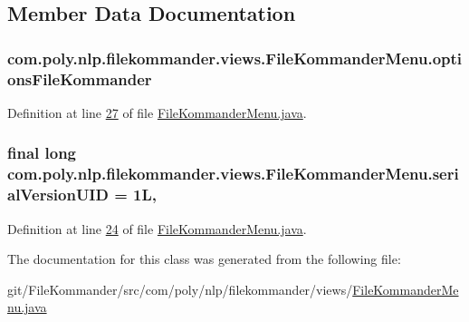 \subsection{Member Data Documentation}
\hypertarget{classcom_1_1poly_1_1nlp_1_1filekommander_1_1views_1_1_file_kommander_menu_a003b2d89fc465db1befab3410121166d}{
\subsubsection[{options\-File\-Kommander}]{ com.\-poly.\-nlp.\-filekommander.\-views.\-File\-Kommander\-Menu.\-options\-File\-Kommander\hspace{0.3cm}{\ttfamily [package]}}}\label{classcom_1_1poly_1_1nlp_1_1filekommander_1_1views_1_1_file_kommander_menu_a003b2d89fc465db1befab3410121166d}


Definition at line \hyperlink{L27}{27} of file \hyperlink{}{File\-Kommander\-Menu.\-java}.

\hypertarget{classcom_1_1poly_1_1nlp_1_1filekommander_1_1views_1_1_file_kommander_menu_ae9f2507a684bcf4de4a7196385e179c7}{
\subsubsection[{serial\-Version\-U\-I\-D}]{\setlength{\rightskip}{0pt plus 5cm}final long com.\-poly.\-nlp.\-filekommander.\-views.\-File\-Kommander\-Menu.\-serial\-Version\-U\-I\-D = 1\-L\hspace{0.3cm}{\ttfamily [static]}, {\ttfamily [private]}}}\label{classcom_1_1poly_1_1nlp_1_1filekommander_1_1views_1_1_file_kommander_menu_ae9f2507a684bcf4de4a7196385e179c7}


Definition at line \hyperlink{L24}{24} of file \hyperlink{}{File\-Kommander\-Menu.\-java}.



The documentation for this class was generated from the following file\-:\begin{DoxyCompactItemize}
\item 
git/\-File\-Kommander/src/com/poly/nlp/filekommander/views/\hyperlink{_file_kommander_menu_8java}{File\-Kommander\-Menu.\-java}\end{DoxyCompactItemize}
